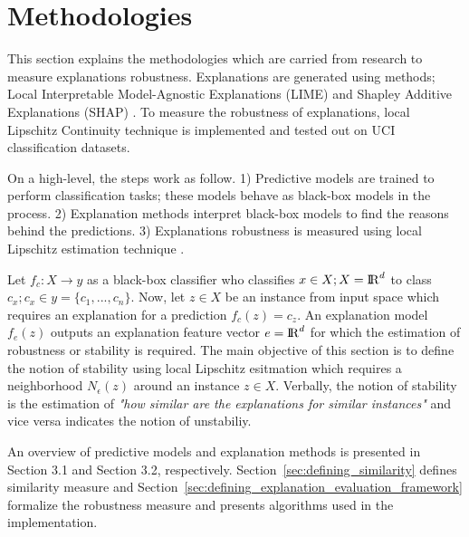 \documentclass[english]{tktltiki2}
\theoremstyle{definition}
\theoremstyle{remark}
\begin{document}
\section{Methodologies} %
This section explains the methodologies which are carried from research to measure explanations robustness. Explanations are generated using methods; Local Interpretable Model-Agnostic Explanations (LIME) and Shapley Additive Explanations (SHAP) \citep{ribeiro2016should,lundberg2017unified}. To measure the robustness of explanations, local Lipschitz Continuity technique \citep{alvarez2018robustness} is implemented and tested out on UCI classification datasets.

On a high-level, the steps work as follow. 1) Predictive models are trained to perform classification tasks; these models behave as black-box models in the process. 2) Explanation methods interpret black-box models to find the reasons behind the predictions. 3) Explanations robustness is measured using local Lipschitz estimation technique \citep{alvarez2018robustness}.

Let $f_c: X \rightarrow y$ as a black-box classifier who classifies $x \in X; X = {\rm I\!R}^d$ to class $c_x; c_x \in y = \{c_1, ..., c_n\}$. Now, let $z \in X$ be an instance from input space which requires an explanation for a prediction $f_c(z) = c_z$. An explanation model $f_e(z)$ outputs an explanation feature vector $ e = {\rm I\!R}^d$ for which the estimation of robustness or stability is required. The main objective of this section is to define the notion of stability using local Lipschitz esitmation which requires a neighborhood $N_{\epsilon}(z)$ around an instance $z \in X$. Verbally, the notion of stability is the estimation of \textit{"how similar are the explanations for similar instances"} and vice versa indicates the notion of unstabiliy.

An overview of predictive models and explanation methods is presented in Section 3.1 and Section 3.2, respectively. Section~\ref{sec:defining_similarity} defines similarity measure and Section~\ref{sec:defining_explanation_evaluation_framework} formalize the robustness measure and presents algorithms used in the implementation.
\end{document}
